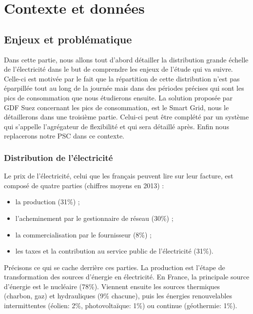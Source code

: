 \section{Contexte et données}

	\subsection{Enjeux et problématique}
	
		Dans cette partie, nous allons tout d’abord détailler la distribution grande échelle de l’électricité dans le but de comprendre les enjeux de l’étude qui va suivre. Celle-ci est motivée par le fait que la répartition de cette distribution n’est pas éparpillée tout au long de la journée mais dans des périodes précises qui sont les pics de consommation que nous étudierons ensuite. La solution proposée par GDF Suez concernant les pics de consommation, est le Smart Grid, nous le détaillerons dans une troisième partie. Celui-ci peut être complété par un système qui s’appelle l’agrégateur de flexibilité et qui sera détaillé après. Enfin nous replacerons notre PSC dans ce contexte.
		
		\subsubsection{Distribution de l'électricité}
		
			Le prix de l'électricité, celui que les français peuvent lire sur leur facture, est composé de quatre parties (chiffres moyens en 2013) :
			\begin{itemize}
				\item la production (31\%) ;
				\item l'acheminement par le gestionnaire de réseau (30\%) ;
				\item la commercialisation par le fournisseur (8\%) ;
				\item les taxes et la contribution au service public de l'électricité (31\%).
			\end{itemize}
			
			Précisons ce qui se cache derrière ces parties.
			La production est l'étape de transformation des sources d'énergie en électricité.
			En France, la principale source d'énergie est le nucléaire (78\%). Viennent ensuite les sources thermiques (charbon, gaz) et hydrauliques (9\% chacune), puis les énergies renouvelables intermittentes (éolien: 2\%, photovoltaïque: 1\%) ou continue (géothermie: 1\%).
			
